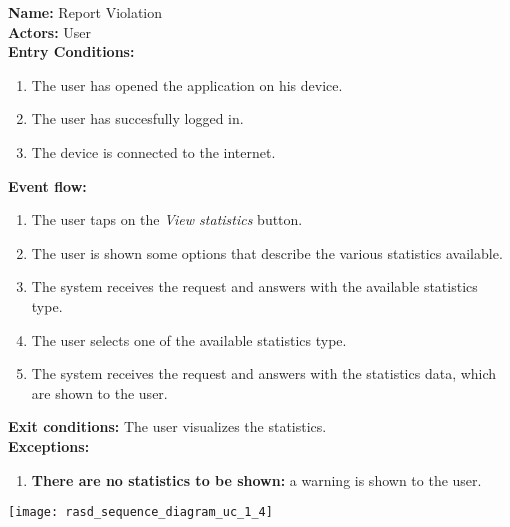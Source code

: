 \begin{usecase}{1.4}
    \textbf{Name: }Report Violation \\
    \textbf{Actors: } User \\
    \textbf{Entry Conditions:}
    \begin{enumerate}
        \item The user has opened the application on his device.
        \item The user has succesfully logged in.
        \item The device is connected to the internet.
    \end{enumerate}
    \textbf{Event flow:}
    \begin{enumerate}
        \item The user taps on the \emph{View statistics} button.
        \item The user is shown some options that describe the various
        statistics available.
        \item The system receives the request and answers with the available
        statistics type.
        \item The user selects one of the available statistics type.
        \item The system receives the request and answers with the statistics
        data, which are shown to the user.
    \end{enumerate}
    \textbf{Exit conditions:} The user visualizes the statistics. \\
    \textbf{Exceptions:}
    \begin{enumerate}
        \item \textbf{There are no statistics to be shown:} a warning is shown
        to the user.
    \end{enumerate}
    \tcblower
    \centering
    \texttt{[image: rasd\_sequence\_diagram\_uc\_1\_4]}
\end{usecase}